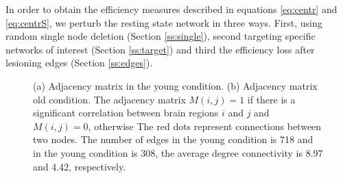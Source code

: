 \documentclass[12pt,a4paper]{article}
\begin{document}
In order to obtain the efficiency measures described in equations \ref{eq:centr} and \ref{eq:centrS}, we perturb the resting state network in three ways. First, using random single node deletion (Section \ref{ss:single}),  second targeting specific networks of interest (Section \ref{ss:target}) and third the efficiency loss after lesioning edges (Section \ref{ss:edges}). 

\begin{figure}[H]
    \hfill
    \caption{\small (a) Adjacency matrix in the young condition.   
  \small (b) Adjacency matrix old condition. The adjacency matrix $M(i,j) =1$ if there is a significant correlation between brain regions $i$ and $j$ and $M(i,j) =0$, otherwise The red dots represent connections between two nodes. The number of edges in the young condition is 718 and in the young condition is 308, the average degree connectivity is 8.97 and 4.42, respectively.}
    \label{fig:adjmat}
  \end{figure} 
 
\end{document}
